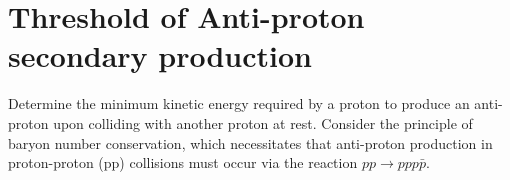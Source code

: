 \section{Threshold of Anti-proton secondary production}

Determine the minimum kinetic energy required by a proton to produce an anti-proton upon colliding with another proton at rest. Consider the principle of baryon number conservation, which necessitates that anti-proton production in proton-proton (pp) collisions must occur via the reaction \( pp \rightarrow ppp\bar p \).
